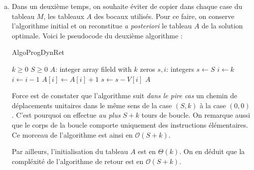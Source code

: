 \documentclass[12pt,a4paper]{article}
\newcommand{\BigO}{\mathcal{O}}
\begin{document}
\begin{enumerate}[a)]
 \item Dans un deuxi\`eme temps, on souhaite \'eviter de copier dans chaque case du tableau $M$, les tableaux $A$ des bocaux utilis\'es. Pour ce faire, on conserve l'algorithme initial et on reconstitue {\itshape a posteriori} le tableau $A$ de la solution optimale. Voici le pseudocode du deuxi\`eme algorithme :
 \begin{algorithm}
\caption{AlgoProgDynRet}
\begin{algorithmic}[1]
\Require $k \geq 0$ \AND $S \geq 0$
    \State $A$: integer array fileld with $k$ zeros
    \State $s, i$: integers
    \State $s \gets S$
    \State $i \gets k$
            \State $i \gets i-1$
        \Else
            \State $A[i] \gets A[i] + 1$
            \State $s \gets s - V[i]$
        \EndIf
    \EndWhile
    \State \Return $A$
\EndFunction
\end{algorithmic}
\end{algorithm}

 
 Force est de constater que l'algorithme suit {\itshape dans le pire cas} un chemin de d\'eplacements unitaires dans le m\^eme sens de la case $(S,k)$ \`a la case $(0,0)$. C'est pourquoi on effectue {\itshape au plus} $S+k$ tours de boucle. On remarque aussi que le corps de la boucle comporte uniquement des instructions \'el\'ementaires. Ce morceau de l'algorithme est ainsi en $\BigO(S+k)$.
 
 Par ailleurs, l'initialisation du tableau $A$ est en $\Theta(k)$. On en d\'eduit que la compl\'exit\'e de l'algorithme de retour est en $\BigO(S+k)$. 
\end{enumerate}
\end{document}
